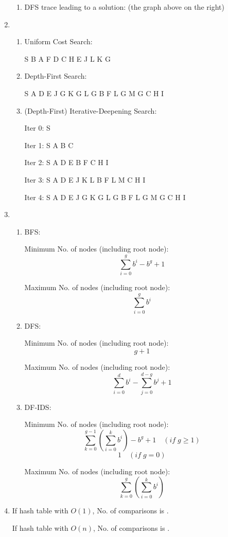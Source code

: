 \documentclass{article}
\begin{document}
\begin{enumerate}
\begin{enumerate}
\item DFS trace leading to a solution: (the graph above on the right)

\end{enumerate}


\item

\begin{enumerate}
\item Uniform Cost Search:
  
  S B A F D C H E J L K G

\item Depth-First Search:

  S A D E J G K G L G B F L G M G C H I

\item (Depth-First) Iterative-Deepening Search:

  Iter 0: S

  Iter 1: S A B C
  
  Iter 2: S A D E B F C H I
  
  Iter 3: S A D E J K L B F L M C H I
  
  Iter 4: S A D E J G K G L G B F L G M G C H I


\end{enumerate}


\item

\begin{enumerate}
\item BFS:

  Minimum No. of nodes (including root node): $${\sum_{i=0}^g b^i} - b^g + 1$$

  Maximum No. of nodes (including root node): $$\sum_{i=0}^g b^i$$

\item DFS:

  Minimum No. of nodes (including root node): $$g+1$$

  Maximum No. of nodes (including root node): $$\sum_{i=0}^d b^i - \sum_{j=0}^{d-g} b^j + 1$$

\item DF-IDS:

  Minimum No. of nodes (including root node): 
  $$\sum_{k=0}^{g-1} (\sum_{i=0}^k b^i) - b^g + 1 \quad (if\;g\geqslant 1)$$
  $$1\quad (if\;g=0)$$

  Maximum No. of nodes (including root node):
  $$\sum_{k=0}^g (\sum_{i=0}^k b^i)$$


\end{enumerate}



\item

If hash table with $O(1)$, No. of comparisons is .

If hash table with $O(n)$, No. of comparisons is .


\end{enumerate}
\end{document}
